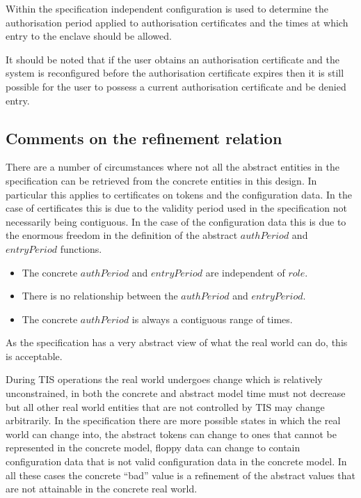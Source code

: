 Within the specification independent configuration is used to
determine the authorisation period applied to authorisation
certificates and the times at which entry to the enclave should be
allowed.

It should be noted that if the user obtains an authorisation
certificate and the system is reconfigured before the authorisation
certificate expires then it is still possible for the user to possess
a current authorisation certificate and be denied entry.

\subsection{Comments on the refinement relation}
There are a number of circumstances where not all the abstract
entities in the specification can be retrieved from the concrete
entities in this design. In particular this applies to certificates on
tokens and the configuration data. In the case of certificates this is
due to the validity period used in the specification not necessarily
being 
contiguous. In the case of the configuration data this is due to the
enormous freedom in the definition of the abstract $authPeriod$ and
$entryPeriod$ functions.
\begin{itemize}
\item
The concrete $authPeriod$ and $entryPeriod$ are
independent of $role$. 
\item
There is no relationship between the $authPeriod$ and
$entryPeriod$. 
\item
The concrete $authPeriod$ is always a contiguous range
of times. 
\end{itemize}

As the specification has a very abstract view of what the real world
can do, this is acceptable. 

During TIS operations the real world undergoes change which is
relatively unconstrained, in both the concrete and abstract model time
must not decrease but all other real world entities that are not
controlled by TIS may change arbitrarily. In the specification there
are more possible states in which the real world can change into, the
abstract tokens can change to ones that cannot be represented in the
concrete model, floppy data can change to contain configuration data
that is not valid configuration data in the concrete model. In all
these cases the concrete ``bad'' value is a refinement of the abstract values
that are not attainable in the concrete real world.

